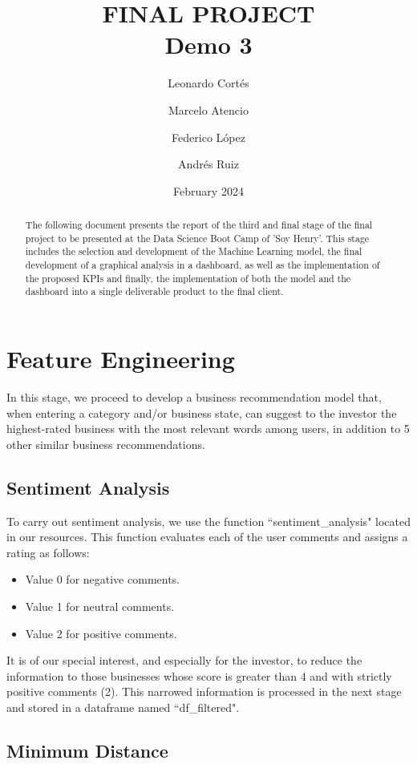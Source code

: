 \documentclass[12pt]{article}
\title{FINAL PROJECT\\
\large Demo 3}
\author{Leonardo Cortés \and Marcelo Atencio \and Federico López \and Andrés Ruiz}
\date{February 2024}
\begin{document}
\maketitle

\begin{abstract}
The following document presents the report of the third and final stage of the final project to be presented at the Data Science Boot Camp of 'Soy Henry'. This stage includes the selection and development of the Machine Learning model, the final development of a graphical analysis in a dashboard, as well as the implementation of the proposed KPIs and finally, the implementation of both the model and the dashboard into a single deliverable product to the final client.
\end{abstract}

\tableofcontents

\section{Feature Engineering}

In this stage, we proceed to develop a business recommendation model that, when entering a category and/or business state, can suggest to the investor the highest-rated business with the most relevant words among users, in addition to 5 other similar business recommendations.


\subsection{Sentiment Analysis}

To carry out sentiment analysis, we use the function ``sentiment\_analysis" located in our resources. This function evaluates each of the user comments and assigns a rating as follows:
\begin{itemize}
    \item Value 0 for negative comments.
    \item Value 1 for neutral comments.
    \item Value 2 for positive comments.
\end{itemize}

It is of our special interest, and especially for the investor, to reduce the information to those businesses whose score is greater than 4 and with strictly positive comments (2). This narrowed information is processed in the next stage and stored in a dataframe named ``df\_filtered".

\subsection{Minimum Distance}
\end{document}
